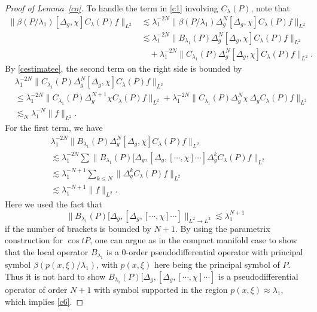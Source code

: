 \documentclass[10pt,a4paper]{amsart}
\newcommand{\la}{\lambda}
\begin{document}
\begin{proof}[Proof of Lemma~\ref{co}]
   To handle the term in \eqref{c1} involving $C_{\la}(P)$, note that 
\begin{equation*}
    \begin{split}
         \|\beta(P/\la_1) [\Delta_g, \chi] C_\la(P) f\|_{L^2}
         &\lesssim \la_1^{-2N}\|\beta(P/\la_1)\Delta_g^N [\Delta_g, \chi] C_\la(P) f\|_{L^2}\\
         &\lesssim \la_1^{-2N}\|B_{\la_1}(P)\Delta_g^N [\Delta_g, \chi] C_\la(P) f\|_{L^2}\\
         &\quad+\la_1^{-2N}\|C_{\la_1}(P)\Delta_g^N [\Delta_g, \chi] C_\la(P) f\|_{L^2}.
    \end{split}
\end{equation*}
By \eqref{cestimatee}, the second term on the right side is bounded by
\begin{equation}\label{c4}
\begin{split}
&\la_1^{-2N}\|C_{\la_1}(P)\Delta_g^N [\Delta_g, \chi] C_\la(P) f\|_{L^2} 
\\ &\leq
    \la_1^{-2N}\|C_{\la_1}(P)\Delta_g^{N+1}  \chi C_\la(P) f\|_{L^2} 
    +  \la_1^{-2N}\|C_{\la_1}(P)\Delta_g^N \chi\,\Delta_g C_\la(P) f\|_{L^2}\\
    &\lesssim_N \la_1^{-N}\| f\|_{L^2}.
\end{split}
\end{equation}
For the first term, we have
\begin{equation}\label{c5}
    \begin{split}
    &\la_1^{-2N}\|B_{\la_1}(P)\Delta_g^N [\Delta_g, \chi] C_\la(P) f\|_{L^2} \\
    &\lesssim \la_1^{-2N}\sum\| B_{\la_1}(P)[\Delta_g,[\Delta_g,[\cdots,\chi]\cdots]\Delta_g^{k} C_{\lambda} (P)f\|_{L^2} \\
    &\lesssim \la_1^{-N+1}\sum_{k\le N}\|\Delta_g^k C_{\lambda} (P)f\|_{L^2}\\
    &\lesssim \la_1^{-N+1}\|f\|_{L^2}.
    \end{split}
\end{equation}
Here we used the fact that 
\begin{equation}\label{c6}
    \| B_{\la_1}(P)[\Delta_g,[\Delta_g,[\cdots,\chi]\cdots]\|_{L^2\to L^2}\lesssim \la_1^{N+1}
\end{equation}
if the number of brackets is bounded by $N+1$. By using the parametrix construction for $\cos tP$, 
 one can argue as in the compact manifold case to show that the local operator $B_{\la_1}$ is a 0-order pseudodifferential operator with principal symbol $\beta(p(x,\xi)/\la_1)$,
with $p(x,\xi)$ here being the principal symbol of $P$. Thus it is not hard to show  $B_{\la_1}(P)[\Delta_g,[\Delta_g,[\cdots,\chi]\cdots]$ is a pseudodifferential operator of order $N+1$ with symbol supported in the region $p(x,\xi)\approx \la_1$, which implies \eqref{c6}.


\end{proof}
\end{document}
